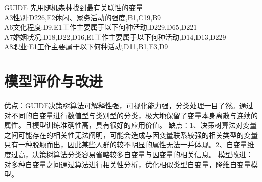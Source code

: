 \documentclass{article}
\begin{document}
\begin{CJK}{UTF8}{gbsn}
GUIDE
先用随机森林找到最有关联性的变量\\
A3性别:D226,E2休闲、家务活动的强度,B1,C19,B9\\
A6文化程度:D9,E1工作主要属于以下何种活动,D229,D65,D221\\
A7婚姻状况;D18,D22,D16,E1工作主要属于以下何种活动,D14,D13,D229\\
A8职业:E1工作主要属于以下何种活动,D11,B1,E3,D9\\

\section{模型评价与改进}
优点：GUIDE决策树算法可解释性强，可视化能力强，分类处理一目了然。通过对不同的自变量进行数值型与类别型的分类，极大地保留了变量本身离散与连续的属性。且模型训练准确性高，具有很好的应用价值。
缺点：1、决策树算法对变量之间可能存在的相关性无法阐明，可能会造成与因变量联系较强的相关类型的变量只有一种脱颖而出，因此某些人群的较不明显的属性无法一并体现。2、自变量维度过高，决策树算法分类容易省略较多自变量与因变量的相关信息。
模型改进：对多种自变量之间通过算法进行相关性分析，优化相似类型自变量，降维自变量模型。
\end{CJK}
\end{document}
